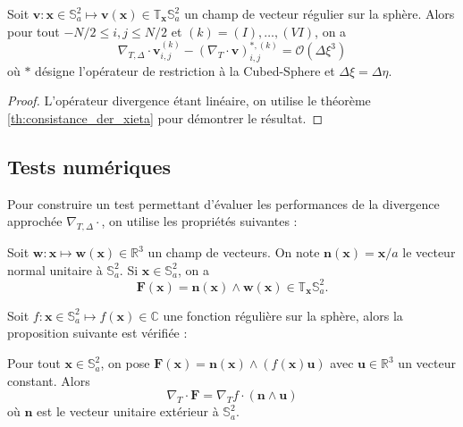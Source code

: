 \begin{proposition}
Soit $\mathbf{v} : \mathbf{x} \in \mathbb{S}_a^2 \mapsto \mathbf{v}(\mathbf{x}) \in \mathbb{T}_{\mathbf{x}} \mathbb{S}_a^2$ un champ de vecteur régulier sur la sphère. Alors pour tout $-N/2 \leq i,j \leq N/2$ et $(k) = (I) , \ldots , (VI)$, on a 
\begin{equation}
\nabla_{T,\Delta} \cdot \mathbf{v}_{i,j}^{(k)} - (\nabla_{T} \cdot \mathbf{v} )_{i,j}^{*,(k)} = \mathcal{O} \left( \Delta \xi^3 \right)
\end{equation}
où $*$ désigne l'opérateur de restriction à la Cubed-Sphere et $\Delta \xi = \Delta \eta$.
\label{prop:accuracy_divergence}
\end{proposition}

\begin{proof}
L'opérateur divergence étant linéaire, on utilise le théorème \ref{th:consistance_der_xieta} pour démontrer le résultat.
\end{proof}

\subsection{Tests numériques}

Pour construire un test permettant d'évaluer les performances de la divergence approchée $\nabla_{T, \Delta} \cdot$, on utilise les propriétés suivantes :

\begin{lemme}
\label{lem:n_vect_w}
Soit $\mathbf{w} : \mathbf{x} \mapsto \mathbf{w}(\mathbf{x}) \in \mathbb{R}^3$ un champ de vecteurs. On note $ \mathbf{n}(\mathbf{x}) = \mathbf{x}/a$ le vecteur normal unitaire à $\mathbb{S}_a^2$. Si $\mathbf{x} \in \mathbb{S}_a^2$, on a
\begin{equation}
\mathbf{F}(\mathbf{x}) = \mathbf{n}(\mathbf{x}) \wedge \mathbf{w}(\mathbf{x}) \in \mathbb{T}_{\mathbf{x}} \mathbb{S}_a^2.
\end{equation}
\end{lemme}

Soit $f : \mathbf{x} \in \mathbb{S}^2_a \mapsto f(\mathbf{x}) \in \mathbb{C}$ une fonction régulière sur la sphère, alors la proposition suivante est vérifiée :

\begin{proposition}
Pour tout $\mathbf{x} \in \mathbb{S}_a^2$, 
on pose $\mathbf{F}(\mathbf{x}) = \mathbf{n}(\mathbf{x}) \wedge (f (\mathbf{x}) \mathbf{u})$ 
avec $\mathbf{u} \in \mathbb{R}^3$ un vecteur constant. Alors
\begin{equation}
\nabla_T \cdot \mathbf{F} = \nabla_T f \cdot \left( \mathbf{n} \wedge \mathbf{u} \right)
\end{equation}
où $\mathbf{n}$ est le vecteur unitaire extérieur à $\mathbb{S}_a^2$.
\label{prop:grad-div_link}
\end{proposition}

